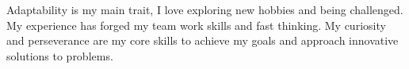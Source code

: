 
\begin{cvparagraph}

Adaptability is my main trait, I love exploring new hobbies and being
challenged. My experience has forged my team work skills and fast
thinking.  My curiosity and perseverance are my core skills to achieve
my goals and approach innovative solutions to problems.

\end{cvparagraph}